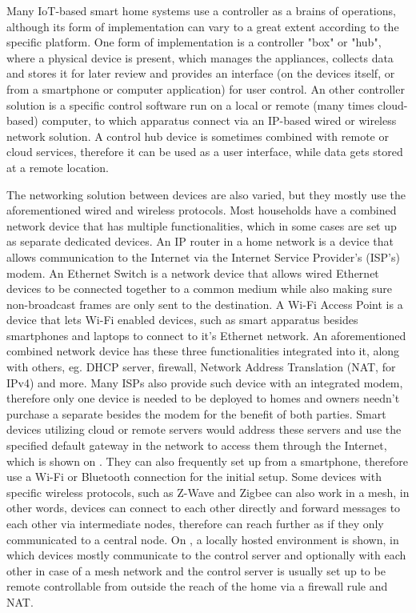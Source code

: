 Many IoT-based smart home systems use a controller as a brains of operations, although its form of implementation can vary to a great extent according to the specific platform. One form of implementation is a controller "box" or "hub", where a physical device is present, which manages the appliances, collects data and stores it for later review and provides an interface (on the devices itself, or from a smartphone or computer application) for user control. An other controller solution is a specific control software run on a local or remote (many times cloud-based) computer, to which apparatus connect via an IP-based wired or wireless network solution. A control hub device is sometimes combined with remote or cloud services, therefore it can be used as a user interface, while data gets stored at a remote location.

The networking solution between devices are also varied, but they mostly use the aforementioned wired and wireless protocols. Most households have a combined network device that has multiple functionalities, which in some cases are set up as separate dedicated devices. An IP router in a home network is a device that allows communication to the Internet via the Internet Service Provider's (ISP's) modem. An Ethernet Switch is a network device that allows wired Ethernet devices to be connected together to a common medium while also making sure non-broadcast frames are only sent to the destination. A Wi-Fi Access Point is a device that lets Wi-Fi enabled devices, such as smart apparatus besides smartphones and laptops to connect to it's Ethernet network. An aforementioned combined network device has these three functionalities integrated into it, along with others, eg. DHCP server, firewall, Network Address Translation (NAT, for IPv4) and more. Many ISPs also provide such device with an integrated modem, therefore only one device is needed to be deployed to homes and owners needn't purchase a separate besides the modem for the benefit of both parties. Smart devices utilizing cloud or remote servers would address these servers and use the specified default gateway in the network to access them through the Internet, which is shown on . They can also frequently set up from a smartphone, therefore use a Wi-Fi or Bluetooth connection for the initial setup. Some devices with specific wireless protocols, such as Z-Wave and Zigbee can also work in a mesh, in other words, devices can connect to each other directly and forward messages to each other via intermediate nodes, therefore can reach further as if they only communicated to a central node. On , a locally hosted environment is shown, in which devices mostly communicate to the control server and optionally with each other in case of a mesh network and the control server is usually set up to be remote controllable from outside the reach of the home via a firewall rule and NAT.

